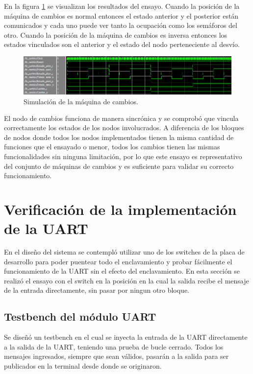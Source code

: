 		En la figura \ref{fig:Test_Cambios} se visualizan los resultados del ensayo. Cuando la posición de la máquina de cambios es normal entonces el estado anterior y el posterior están comunicados y cada uno puede ver tanto la ocupación como los semáforos del otro. Cuando la posición de la máquina de cambios es inversa entonces los estados vinculados son el anterior y el estado del nodo perteneciente al desvío.
		
		\begin{figure}[h]
		\centering
		\includegraphics[scale=0.55]{./Figures/Test/Cambio}
			\caption{Simulación de la máquina de cambios.}
			\label{fig:Test_Cambios}
		\end{figure}
			
		El nodo de cambios funciona de manera sincrónica y se comprobó que vincula correctamente los estados de los nodos involucrados. A diferencia de los bloques de nodos donde todos los nodos implementados tienen la misma cantidad de funciones que el ensayado o menor, todos los cambios tienen las mismas funcionalidades sin ninguna limitación, por lo que este ensayo es representativo del conjunto de máquinas de cambios y es suficiente para validar su correcto funcionamiento.
				
\section{Verificación de la implementación de la UART}

	En el diseño del sistema se contempló utilizar uno de los switches de la placa de desarrollo para poder puentear todo el enclavamiento y probar fácilmente el funcionamiento de la UART sin el efecto del enclavamiento. En esta sección se realizó el ensayo con el switch en la posición en la cual la salida recibe el mensaje de la entrada directamente, sin pasar por ningun otro bloque.

	\subsection{Testbench del módulo UART}
			
		Se diseñó un testbench en el cual se inyecta la entrada de la UART directamente a la salida de la UART, teniendo una prueba de bucle cerrado. Todos los mensajes ingresados, siempre que sean válidos, pasarán a la salida para ser publicados en la terminal desde donde se originaron.
						
